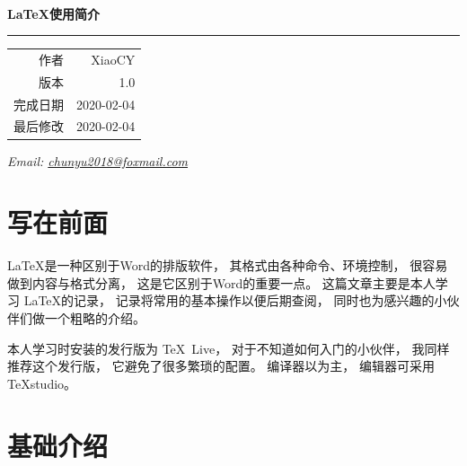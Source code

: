 \documentclass{ctexart}
\numberwithin{equation}{section}			%
\begin{document}
	\begin{titlepage}
		\ %
		
		\vspace{\fill}
		
		\begin{flushright}
			{\Huge\bfseries\LaTeX 使用简介} \\
			\rule[1em]{\linewidth}{0.5ex}
			
			\begin{tabular}{rr}
				作者 & XiaoCY \\
				版本 & 1.0 \\
				完成日期 & 2020-02-04 \\
				最后修改 & 2020-02-04
			\end{tabular}
		\end{flushright}
		
		
		{\noindent\slshape Email: 
		 \href{mailto:chunyu2018@foxmail.com}
			{chunyu2018@foxmail.com}
		}
	\end{titlepage}

	
	\tableofcontents		%
	\clearpage
	
	\listoftables
	\clearpage
	
	\setcounter{page}{1}	%
	
	\section{写在前面}
	\LaTeX 是一种区别于Word的排版软件，
	其格式由各种命令、环境控制，
	很容易做到内容与格式分离，
	这是它区别于Word的重要一点。
	这篇文章主要是本人学习 \LaTeX 的记录\cite{liuhaiyang}，
	记录将常用的基本操作以便后期查阅，
	同时也为感兴趣的小伙伴们做一个粗略的介绍。
	
	本人学习时安装的发行版为 \TeX~Live，
	对于不知道如何入门的小伙伴，
	我同样推荐这个发行版，
	它避免了很多繁琐的配置。
	编译器以\XeLaTeX 为主，
	编辑器可采用TeXstudio。
	
	\section{基础介绍}
\end{document}
